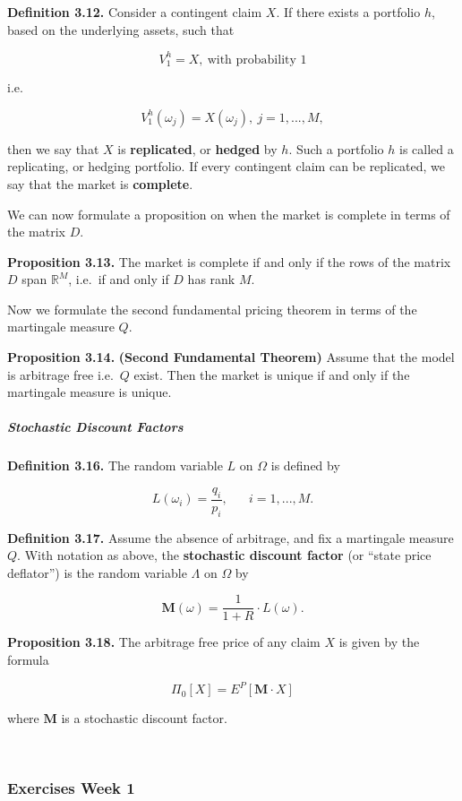 \documentclass[
]{article}
\begin{document}
\textbf{Definition 3.12.} Consider a contingent claim \(X\). If there
exists a portfolio \(h\), based on the underlying assets, such that

\[
V_1^h=X,\ \text{with probability 1}\tag{3.11}
\]

i.e.

\[
V_1^h(\omega_j)=X(\omega_j),\ j=1,...,M,\tag{3.12}
\]

then we say that \(X\) is \textbf{replicated}, or \textbf{hedged} by
\(h\). Such a portfolio \(h\) is called a replicating, or hedging
portfolio. If every contingent claim can be replicated, we say that the
market is \textbf{complete}.

We can now formulate a proposition on when the market is complete in
terms of the matrix \(D\).

\textbf{Proposition 3.13.} The market is complete if and only if the
rows of the matrix \(D\) span \(\mathbb{R}^M\), i.e.~if and only if
\(D\) has rank \(M\).

Now we formulate the second fundamental pricing theorem in terms of the
martingale measure \(Q\).

\textbf{Proposition 3.14.} \textbf{(Second Fundamental Theorem)} Assume
that the model is arbitrage free i.e.~\(Q\) exist. Then the market is
unique if and only if the martingale measure is unique.

\hypertarget{stochastic-discount-factors}{%
\subparagraph{Stochastic Discount
Factors}\label{stochastic-discount-factors}}

\textbf{Definition 3.16.} The random variable \(L\) on \(\Omega\) is
defined by

\[
L(\omega_i)=\frac{q_i}{p_i},\hspace{20pt} i=1,...,M.
\]

\textbf{Definition 3.17.} Assume the absence of arbitrage, and fix a
martingale measure \(Q\). With notation as above, the \textbf{stochastic
discount factor} (or ``state price deflator'') is the random variable
\(\Lambda\) on \(\Omega\) by

\[
\mathbf{M}(\omega)=\frac{1}{1+R}\cdot L(\omega).\tag{3.19}
\]

\textbf{Proposition 3.18.} The arbitrage free price of any claim \(X\)
is given by the formula

\[
\Pi_0[X]=E^P[\mathbf{M}\cdot X]
\]

where \(\mathbf{M}\) is a stochastic discount factor.

~

\hypertarget{exercises-week-1}{%
\subsubsection{Exercises Week 1}\label{exercises-week-1}}
\end{document}
